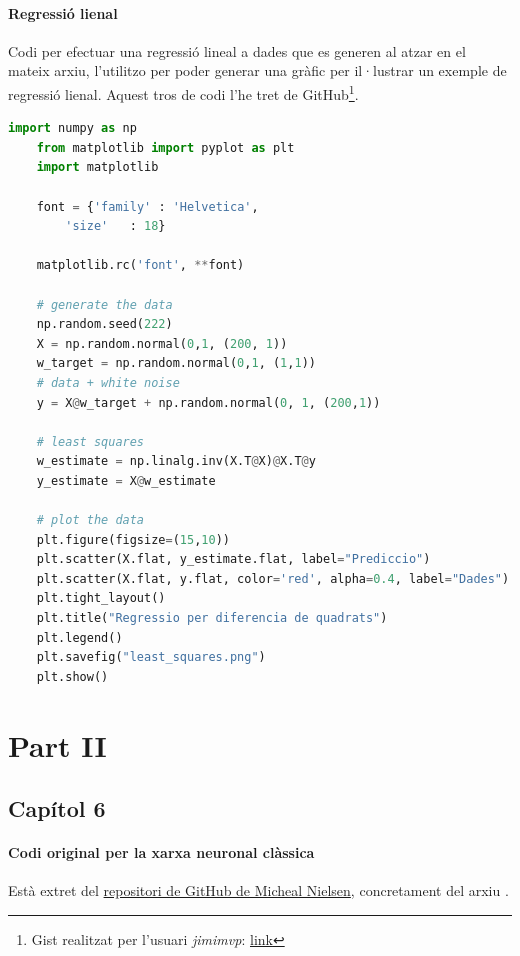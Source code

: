 \paragraph{Regressió lienal}
\label{lst:linear_regression}
Codi per efectuar una regressió lineal a dades que es generen al atzar en el mateix arxiu, l'utilitzo per poder generar una gràfic per il·lustrar un exemple de regressió lienal. Aquest tros de codi l'he tret de GitHub\footnote{Gist realitzat per l'usuari \textit{jimimvp}: \href{https://gist.github.com/jimimvp/05ece11fec25d5c8c009af9ba469d6c2}{link}}.

\begin{lstlisting}[language=Python, caption=Regressió lineal]
	import numpy as np
	from matplotlib import pyplot as plt
	import matplotlib
	
	font = {'family' : 'Helvetica',
		'size'   : 18}
	
	matplotlib.rc('font', **font)
	
	# generate the data
	np.random.seed(222)
	X = np.random.normal(0,1, (200, 1))
	w_target = np.random.normal(0,1, (1,1))
	# data + white noise
	y = X@w_target + np.random.normal(0, 1, (200,1))
	
	# least squares
	w_estimate = np.linalg.inv(X.T@X)@X.T@y
	y_estimate = X@w_estimate
	
	# plot the data
	plt.figure(figsize=(15,10))
	plt.scatter(X.flat, y_estimate.flat, label="Prediccio")
	plt.scatter(X.flat, y.flat, color='red', alpha=0.4, label="Dades")
	plt.tight_layout()
	plt.title("Regressio per diferencia de quadrats")
	plt.legend()
	plt.savefig("least_squares.png")
	plt.show()
\end{lstlisting}

\section{Part II}
\subsection{Capítol 6}

\paragraph{Codi original per la xarxa neuronal clàssica}
\label{lst:disc_original}
Està extret del \href{https://github.com/mnielsen/neural-networks-and-deep-learning}{repositori de GitHub de Micheal Nielsen}, concretament del arxiu .



